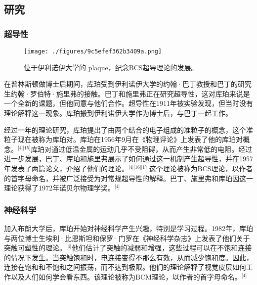 \subsection{研究}
\subsubsection{超导性}
\begin{figure}[ht]
\centering
\texttt{[image: ./figures/9c5efef362b3409a.png]}
\caption{位于伊利诺伊大学的 plaque，纪念BCS超导理论的发展。} \label{fig_LAkb_2}
\end{figure}
在普林斯顿做博士后期间，库珀受到伊利诺伊大学的约翰·巴丁教授和巴丁的研究生约翰·罗伯特·施里弗的接触。巴丁和施里弗正在研究超导性，这对库珀来说是一个全新的课题，但他同意与他们合作。超导性在1911年被实验发现，但当时没有理论解释这一现象。库珀搬到伊利诺伊大学作为博士后，与巴丁一起工作。

经过一年的理论研究，库珀提出了由两个结合的电子组成的准粒子的概念，这个准粒子现在被称为库珀对。库珀在1956年9月在《物理评论》上发表了他的库珀对概念。\(^\text{[4][15]}\)库珀对通过低温金属的运动几乎不受阻碍，从而产生非常低的电阻。经过进一步发展，巴丁、库珀和施里弗展示了如何通过这一机制产生超导性，并在1957年发表了两篇论文，介绍了他们的理论。\(^\text{[4][16][17]}\)这个理论被称为BCS理论，以作者的首字母命名，并被广泛接受为对常规超导性的解释。巴丁、施里弗和库珀因这一理论获得了1972年诺贝尔物理学奖。\(^\text{[4]}\)
\subsubsection{神经科学}
加入布朗大学后，库珀开始对神经科学产生兴趣，特别是学习过程。1982年，库珀与两位博士生埃利·比恩斯坦和保罗·门罗在《神经科学杂志》上发表了他们关于突触可塑性的理论。\(^\text{[4]}\)他们估计了突触的减弱和增强，这些过程可以在不饱和连接的情况下发生。当突触饱和时，电连接变得不那么有效，从而减少饱和度。因此，连接在饱和和不饱和之间振荡，而不达到极限。他们的理论解释了视觉皮层如何工作以及人们如何学会看东西。该理论被称为BCM理论，以作者的首字母命名。\(^\text{[4]}\)
